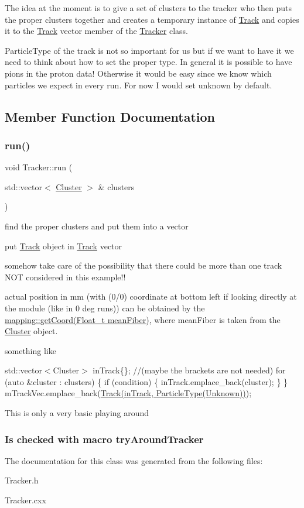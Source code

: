 The idea at the moment is to give a set of clusters to the tracker who then puts the proper clusters together and creates a temporary instance of \hyperlink{classTrack}{Track} and copies it to the \hyperlink{classTrack}{Track} vector member of the \hyperlink{classTracker}{Tracker} class.

Particle\+Type of the track is not so important for us but if we want to have it we need to think about how to set the proper type. In general it is possible to have pions in the proton data! Otherwise it would be easy since we know which particles we expect in every run. For now I would set unknown by default. 

\subsection{Member Function Documentation}
\mbox{\label{classTracker_aebeb8b9c0504f9ab36956a3c6dd686c2}} 
\subsubsection{\texorpdfstring{run()}{run()}}
{\footnotesize\ttfamily void Tracker\+::run (\begin{DoxyParamCaption}\item[{std\+::vector$<$ \hyperlink{classCluster}{Cluster} $>$ \&}]{clusters }\end{DoxyParamCaption})}


\begin{DoxyItemize}
\item find the proper clusters and put them into a vector
\item put \hyperlink{classTrack}{Track} object in \hyperlink{classTrack}{Track} vector
\item somehow take care of the possibility that there could be more than one track N\+OT considered in this example!!
\end{DoxyItemize}

actual position in mm (with (0/0) coordinate at bottom left if looking directly at the module (like in 0 deg runs)) can be obtained by the \hyperlink{namespacemapping_a3d99dd98372f99c279f77b9cfa250411}{mapping\+::get\+Coord(\+Float\+\_\+t mean\+Fiber)}, where mean\+Fiber is taken from the \hyperlink{classCluster}{Cluster} object.

something like

std\+::vector$<$\+Cluster$>$ in\+Track\{\}; //(maybe the brackets are not needed) for (auto \&cluster \+: clusters) \{ if (condition) \{ in\+Track.\+emplace\+\_\+back(cluster); \} \} m\+Track\+Vec.\+emplace\+\_\+back(\hyperlink{classTrack}{Track(in\+Track, Particle\+Type(\+Unknown))});

This is only a very basic playing around \subsubsection*{Is checked with macro try\+Around\+Tracker }





The documentation for this class was generated from the following files\+:\begin{DoxyCompactItemize}
\item 
Tracker.\+h\item 
Tracker.\+cxx\end{DoxyCompactItemize}
